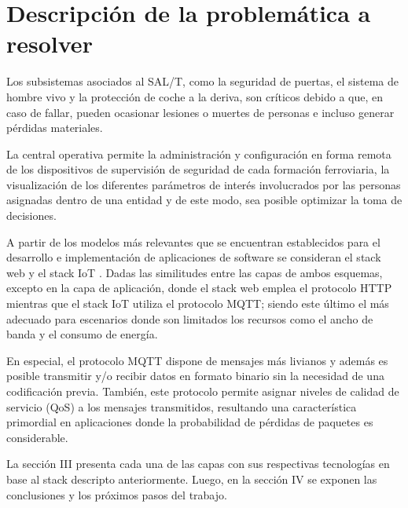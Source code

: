 \section{Descripción de la problemática a resolver}

Los subsistemas asociados al SAL/T, como la seguridad de puertas, el sistema de hombre vivo y la protección de coche a la deriva, son críticos debido a que, en caso de fallar, pueden ocasionar lesiones o muertes de personas e incluso generar pérdidas materiales. 

La central operativa permite la administración y configuración en forma remota de los dispositivos de supervisión de seguridad de cada formación ferroviaria, la visualización de los diferentes parámetros de interés involucrados por las personas asignadas dentro de una entidad y de este modo, sea posible optimizar la toma de decisiones. 

A partir de los modelos más relevantes que se encuentran establecidos para el desarrollo e implementación de aplicaciones de software se consideran el stack web y el stack IoT \cite{b4} . 
Dadas las similitudes entre las capas de ambos esquemas, excepto en la capa de aplicación, donde el stack web emplea el protocolo HTTP mientras que el stack IoT utiliza el protocolo MQTT; siendo
este último el más adecuado para escenarios donde son limitados los recursos como el ancho de banda y el consumo de energía.

En especial, el protocolo MQTT dispone de mensajes más livianos y además es posible transmitir y/o recibir datos en formato binario sin la necesidad de una codificación previa.
También, este protocolo permite asignar niveles de calidad de servicio (QoS) a los mensajes transmitidos, 
resultando una característica primordial en aplicaciones donde la probabilidad de pérdidas de paquetes es considerable.

La sección III presenta cada una de las capas con sus respectivas tecnologías en base al stack descripto anteriormente. Luego, en la sección IV se exponen las conclusiones y los próximos pasos del trabajo.


